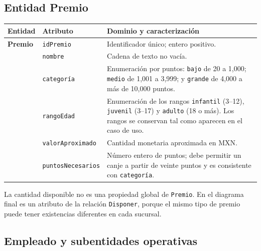 \subsection{Entidad Premio}

\begin{center}
\small
\begin{tabularx}{\textwidth}{@{}>{\bfseries\color{unamblue}}p{}p{}X@{}}
\toprule
Entidad & Atributo & Dominio y caracterización \\
\midrule
Premio & \texttt{idPremio} & Identificador único; entero positivo. \\
 & \texttt{nombre} & Cadena de texto no vacía. \\
 & \texttt{categoría} & Enumeración por puntos: \texttt{bajo} de 20 a 1,000;
   \texttt{medio} de 1,001 a 3,999; y \texttt{grande} de 4,000 a más de
   10,000 puntos. \\
 & \texttt{rangoEdad} & Enumeración de los rangos \texttt{infantil} (3--12),
   \texttt{juvenil} (3--17) y \texttt{adulto} (18 o más). Los rangos se
   conservan tal como aparecen en el caso de uso. \\
 & \texttt{valorAproximado} & Cantidad monetaria aproximada en MXN. \\
 & \texttt{puntosNecesarios} & Número entero de puntos; debe permitir un canje
   a partir de veinte puntos y es consistente con \texttt{categoría}. \\
\bottomrule
\end{tabularx}
\end{center}

La cantidad disponible no es una propiedad global de \texttt{Premio}. En el
diagrama final es un atributo de la relación \texttt{Disponer}, porque el mismo
tipo de premio puede tener existencias diferentes en cada sucursal.

\subsection{Empleado y subentidades operativas}

